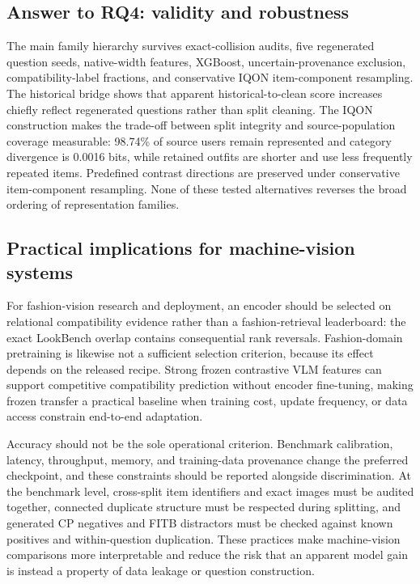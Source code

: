 \documentclass[preprint,12pt]{elsarticle}
\begin{document}
\subsection{Answer to RQ4: validity and robustness}

The main family hierarchy survives exact-collision audits, five regenerated question seeds, native-width features, XGBoost, uncertain-provenance exclusion, compatibility-label fractions, and conservative IQON item-component resampling. The historical bridge shows that apparent historical-to-clean score increases chiefly reflect regenerated questions rather than split cleaning. The IQON construction makes the trade-off between split integrity and source-population coverage measurable: 98.74\% of source users remain represented and category divergence is 0.0016 bits, while retained outfits are shorter and use less frequently repeated items. Predefined contrast directions are preserved under conservative item-component resampling. None of these tested alternatives reverses the broad ordering of representation families.

\subsection{Practical implications for machine-vision systems}

For fashion-vision research and deployment, an encoder should be selected on relational compatibility evidence rather than a fashion-retrieval leaderboard: the exact LookBench overlap contains consequential rank reversals. Fashion-domain pretraining is likewise not a sufficient selection criterion, because its effect depends on the released recipe. Strong frozen contrastive VLM features can support competitive compatibility prediction without encoder fine-tuning, making frozen transfer a practical baseline when training cost, update frequency, or data access constrain end-to-end adaptation.

Accuracy should not be the sole operational criterion. Benchmark calibration, latency, throughput, memory, and training-data provenance change the preferred checkpoint, and these constraints should be reported alongside discrimination. At the benchmark level, cross-split item identifiers and exact images must be audited together, connected duplicate structure must be respected during splitting, and generated CP negatives and FITB distractors must be checked against known positives and within-question duplication. These practices make machine-vision comparisons more interpretable and reduce the risk that an apparent model gain is instead a property of data leakage or question construction.
\end{document}
